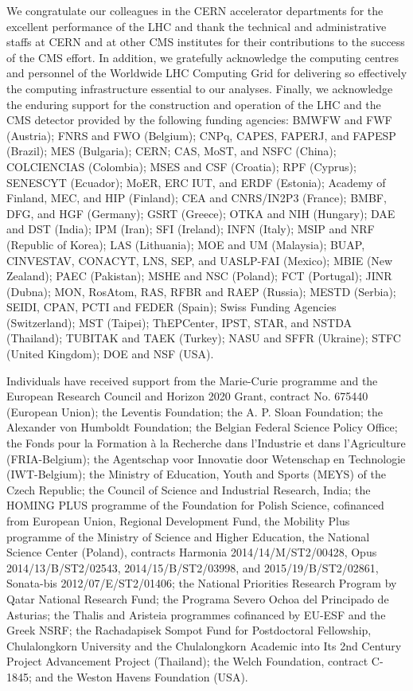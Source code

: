 \begin{acknowledgments}
We congratulate our colleagues in the CERN accelerator departments for
the excellent performance of the LHC and thank the technical and
administrative staffs at CERN and at other CMS institutes for their
contributions to the success of the CMS effort. In addition, we
gratefully acknowledge the computing centres and personnel of the
Worldwide LHC Computing Grid for delivering so effectively the
computing infrastructure essential to our analyses. Finally, we
acknowledge the enduring support for the construction and operation of
the LHC and the CMS detector provided by the following funding
agencies: BMWFW and FWF (Austria); FNRS and FWO (Belgium); CNPq,
CAPES, FAPERJ, and FAPESP (Brazil); MES (Bulgaria); CERN; CAS, MoST,
and NSFC (China); COLCIENCIAS (Colombia); MSES and CSF (Croatia); RPF
(Cyprus); SENESCYT (Ecuador); MoER, ERC IUT, and ERDF (Estonia);
Academy of Finland, MEC, and HIP (Finland); CEA and CNRS/IN2P3
(France); BMBF, DFG, and HGF (Germany); GSRT (Greece); OTKA and NIH
(Hungary); DAE and DST (India); IPM (Iran); SFI (Ireland); INFN
(Italy); MSIP and NRF (Republic of Korea); LAS (Lithuania); MOE and UM
(Malaysia); BUAP, CINVESTAV, CONACYT, LNS, SEP, and UASLP-FAI
(Mexico); MBIE (New Zealand); PAEC (Pakistan); MSHE and NSC (Poland);
FCT (Portugal); JINR (Dubna); MON, RosAtom, RAS, RFBR and RAEP
(Russia); MESTD (Serbia); SEIDI, CPAN, PCTI and FEDER (Spain); Swiss
Funding Agencies (Switzerland); MST (Taipei); ThEPCenter, IPST, STAR,
and NSTDA (Thailand); TUBITAK and TAEK (Turkey); NASU and SFFR
(Ukraine); STFC (United Kingdom); DOE and NSF (USA).

 Individuals have received support from the
Marie-Curie programme and the European Research Council and Horizon
2020 Grant, contract No. 675440 (European Union); the Leventis
Foundation; the A. P. Sloan Foundation; the Alexander von Humboldt
Foundation; the Belgian Federal Science Policy Office; the Fonds pour
la Formation \`a la Recherche dans l'Industrie et dans l'Agriculture
(FRIA-Belgium); the Agentschap voor Innovatie door Wetenschap en
Technologie (IWT-Belgium); the Ministry of Education, Youth and Sports
(MEYS) of the Czech Republic; the Council of Science and Industrial
Research, India; the HOMING PLUS programme of the Foundation for
Polish Science, cofinanced from European Union, Regional Development
Fund, the Mobility Plus programme of the Ministry of Science and
Higher Education, the National Science Center (Poland), contracts
Harmonia 2014/14/M/ST2/00428, Opus 2014/13/B/ST2/02543,
2014/15/B/ST2/03998, and 2015/19/B/ST2/02861, Sonata-bis
2012/07/E/ST2/01406; the National Priorities Research Program by Qatar
National Research Fund; the Programa Severo Ochoa del Principado de
Asturias; the Thalis and Aristeia programmes cofinanced by EU-ESF and
the Greek NSRF; the Rachadapisek Sompot Fund for Postdoctoral
Fellowship, Chulalongkorn University and the Chulalongkorn Academic
into Its 2nd Century Project Advancement Project (Thailand); the Welch
Foundation, contract C-1845; and the Weston Havens Foundation (USA).
\end{acknowledgments}

